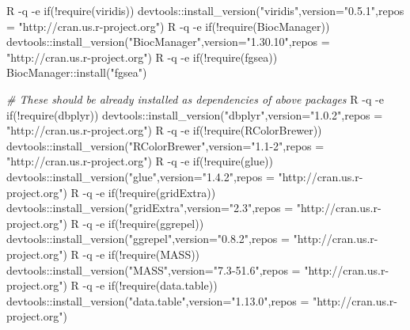 \documentclass[
]{book}
\newenvironment{Shaded}{\begin{snugshade}}{\end{snugshade}}
\newcommand{\CommentTok}[1]{\textcolor[rgb]{0.56,0.35,0.01}{\textit{#1}}}
\newcommand{\NormalTok}[1]{#1}
\newcommand{\SpecialCharTok}[1]{\textcolor[rgb]{0.00,0.00,0.00}{#1}}
\newcommand{\StringTok}[1]{\textcolor[rgb]{0.31,0.60,0.02}{#1}}
\begin{document}
\begin{Shaded}
\begin{Highlighting}[]
\NormalTok{R }\SpecialCharTok{{-}}\NormalTok{q }\SpecialCharTok{{-}}\NormalTok{e }\StringTok{\textquotesingle{}if(!require(viridis)) devtools::install\_version("viridis",version="0.5.1",repos = "http://cran.us.r{-}project.org")\textquotesingle{}}
\NormalTok{R }\SpecialCharTok{{-}}\NormalTok{q }\SpecialCharTok{{-}}\NormalTok{e }\StringTok{\textquotesingle{}if(!require(BiocManager)) devtools::install\_version("BiocManager",version="1.30.10",repos = "http://cran.us.r{-}project.org")\textquotesingle{}}
\NormalTok{R }\SpecialCharTok{{-}}\NormalTok{q }\SpecialCharTok{{-}}\NormalTok{e }\StringTok{\textquotesingle{}if(!require(fgsea)) BiocManager::install("fgsea")\textquotesingle{}}

\CommentTok{\# These should be already installed as dependencies of above packages}
\NormalTok{R }\SpecialCharTok{{-}}\NormalTok{q }\SpecialCharTok{{-}}\NormalTok{e }\StringTok{\textquotesingle{}if(!require(dbplyr)) devtools::install\_version("dbplyr",version="1.0.2",repos = "http://cran.us.r{-}project.org")\textquotesingle{}}
\NormalTok{R }\SpecialCharTok{{-}}\NormalTok{q }\SpecialCharTok{{-}}\NormalTok{e }\StringTok{\textquotesingle{}if(!require(RColorBrewer)) devtools::install\_version("RColorBrewer",version="1.1{-}2",repos = "http://cran.us.r{-}project.org")\textquotesingle{}}
\NormalTok{R }\SpecialCharTok{{-}}\NormalTok{q }\SpecialCharTok{{-}}\NormalTok{e }\StringTok{\textquotesingle{}if(!require(glue)) devtools::install\_version("glue",version="1.4.2",repos = "http://cran.us.r{-}project.org")\textquotesingle{}}
\NormalTok{R }\SpecialCharTok{{-}}\NormalTok{q }\SpecialCharTok{{-}}\NormalTok{e }\StringTok{\textquotesingle{}if(!require(gridExtra)) devtools::install\_version("gridExtra",version="2.3",repos = "http://cran.us.r{-}project.org")\textquotesingle{}}
\NormalTok{R }\SpecialCharTok{{-}}\NormalTok{q }\SpecialCharTok{{-}}\NormalTok{e }\StringTok{\textquotesingle{}if(!require(ggrepel)) devtools::install\_version("ggrepel",version="0.8.2",repos = "http://cran.us.r{-}project.org")\textquotesingle{}}
\NormalTok{R }\SpecialCharTok{{-}}\NormalTok{q }\SpecialCharTok{{-}}\NormalTok{e }\StringTok{\textquotesingle{}if(!require(MASS)) devtools::install\_version("MASS",version="7.3{-}51.6",repos = "http://cran.us.r{-}project.org")\textquotesingle{}}
\NormalTok{R }\SpecialCharTok{{-}}\NormalTok{q }\SpecialCharTok{{-}}\NormalTok{e }\StringTok{\textquotesingle{}if(!require(data.table)) devtools::install\_version("data.table",version="1.13.0",repos = "http://cran.us.r{-}project.org")\textquotesingle{}}
\end{Highlighting}
\end{Shaded}
\end{document}
